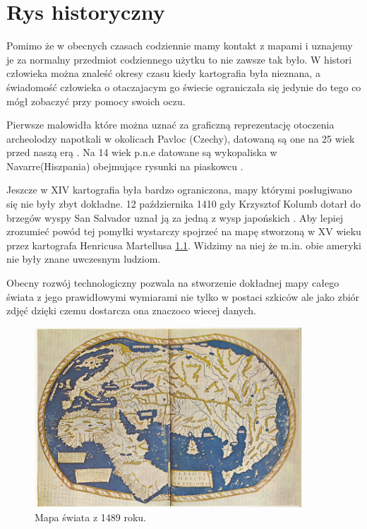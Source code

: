 
\chapter{Rys historyczny}
\label{sec:hisotryMap}

Pomimo że w obecnych czasach codziennie mamy kontakt z mapami i uznajemy je za normalny przedmiot codziennego użytku to nie zawsze tak było. W histori człowieka można znaleść okresy czasu kiedy kartografia była nieznana, a świadomość człowieka o otaczajacym go świecie ograniczała się jedynie do tego co mógł zobaczyć przy pomocy swoich oczu.

Pierwsze malowidła które można uznać za graficzną reprezentację otoczenia archeolodzy napotkali w okolicach Pavloc (Czechy), datowaną są one na 25 wiek przed naszą erą \cite{pre2} . Na 14 wiek p.n.e datowane są wykopaliska w Navarre(Hiszpania) obejmujące rysunki na piaskowcu \cite{pre1}.

Jeszcze w XIV kartografia była bardzo ograniczona, mapy którymi posługiwano się nie były zbyt dokładne. 12 października 1410 gdy Krzysztof Kolumb dotarł do brzegów wyspy San Salvador uznał ją za jedną z wysp japońskich \cite{columb}. Aby lepiej zrozumieć powód tej pomyłki wystarczy spojrzeć na mapę stworzoną w XV wieku przez kartografa Henricusa Martellusa \ref{fig:worldMap1}. Widzimy na niej że m.in. obie ameryki nie były znane uwczesnym ludziom.

Obecny rozwój technologiczny pozwala na stworzenie dokładnej mapy całego świata z jego prawidłowymi wymiarami nie tylko w postaci szkiców ale jako zbiór zdjęć dzięki czemu dostarcza ona znaczoco wiecej danych.

\begin{figure}[H]
  \centering
    \includegraphics[width=100mm]{ge/worldMap1.jpg}
  \caption{Mapa świata z 1489 roku.}
  \label{fig:worldMap1}
\end{figure}
